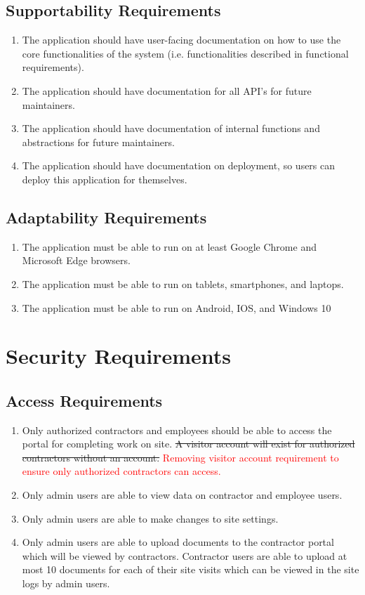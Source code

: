\documentclass[12pt]{article}
\begin{document}
\subsection{Supportability Requirements}
\begin{enumerate} [{MS-SUP}1.]
  \item The application should have user-facing documentation on how to use the
    core functionalities of the system (i.e. functionalities described in
    functional requirements).
  \item The application should have documentation for all API's for future
    maintainers.
  \item The application should have documentation of internal functions and
    abstractions for future maintainers.
  \item The application should have documentation on deployment, so users can
    deploy this application for themselves.
\end{enumerate}
\subsection{Adaptability Requirements}
\begin{enumerate} [{MS-ADP}1.]
  \item The application must be able to run on at least Google Chrome and
    Microsoft Edge browsers.
  \item The application must be able to run on tablets, smartphones, and
    laptops.
  \item The application must be able to run on Android, IOS, and Windows 10
\end{enumerate}

\section{Security Requirements}
\subsection{Access Requirements}
\begin{enumerate} [{SR-AR}1.]
  \item Only authorized contractors and employees should be able to access the
    portal for completing work on site. \sout{A visitor account will exist for authorized contractors without an account.} 
    \textcolor{red}{Removing visitor account requirement to ensure only authorized contractors can access.}
  \item Only admin users are able to view data on contractor and employee users.
  \item Only admin users are able to make changes to site settings.
  \item Only admin users are able to upload documents to the contractor portal which will be viewed by contractors. Contractor users
  are able to upload at most 10 documents for each of their site visits which can be viewed in the site logs by admin users.
\end{enumerate}
\end{document}
